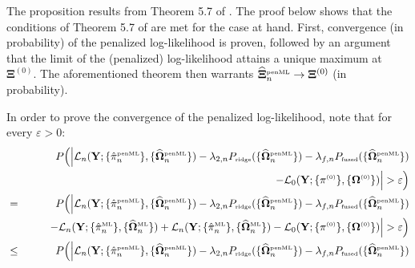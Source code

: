 \documentclass[10pt]{article}
\makeatletter
\newcommand{\proofname}{Proof.}
\newcounter{proof}\newcounter{currproofctr}\newcounter{endproofctr}%
\newenvironment{proof}[1][\proofname]{
  \th@nonumberplain
  \def\theorem@headerfont{\itshape}%
  \normalfont
  \@thm{proof}{proof}{#1}}%
  {\@endtheorem}
\makeatother
\begin{document}
\begin{proof}
The proposition results from Theorem 5.7 of \cite{VdVa2000}. The proof below shows that the conditions of Theorem 5.7 of  \cite{VdVa2000} are met for the case at hand. First, convergence (in probability) of the penalized log-likelihood is proven, followed by an argument that the limit of the (penalized) log-likelihood attains a unique maximum at $\mathbf{\Xi}^{(0)}$. The aforementioned theorem then warrants $\widehat{\mathbf{\Xi}}^{\mbox{{\tiny penML}}}_n \rightarrow \mathbf{\Xi}^{(0)}$ (in probability).

In order to prove the convergence of the penalized log-likelihood, note that for every $\varepsilon > 0$:
\begin{eqnarray}
& & \nonumber \hspace{-1.5cm} P \Big( \Big| \mathcal{L}_n(\mathbf{Y}; \{\hat{\pi}_n^{\mbox{{\tiny penML}}} \}, \{\widehat{\mathbf{\Omega}}_n^{\mbox{{\tiny penML}}} \} ) - \lambda_{2,n} P_{\mbox{{\tiny ridge}}}( \{\widehat{\mathbf{\Omega}}_n^{\mbox{{\tiny penML}}} \}) - \lambda_{f,n} P_{\mbox{{\tiny fused}}}( \{\widehat{\mathbf{\Omega}}_n^{\mbox{{\tiny penML}}} \})
\\
& & \nonumber  \qquad  - \mathcal{L}_0(\mathbf{Y}; \{\pi^{\mbox{{\tiny (0)}}} \}, \{\mathbf{\Omega}^{\mbox{{\tiny (0)}}} \} ) \Big| > \varepsilon \Big)
\\
& = & \nonumber  P \Big( \Big| \mathcal{L}_n(\mathbf{Y}; \{\hat{\pi}_n^{\mbox{{\tiny penML}}} \}, \{\widehat{\mathbf{\Omega}}_n^{\mbox{{\tiny penML}}} \} ) - \lambda_{2,n} P_{\mbox{{\tiny ridge}}}( \{\widehat{\mathbf{\Omega}}_n^{\mbox{{\tiny penML}}} \}) - \lambda_{f,n} P_{\mbox{{\tiny fused}}}( \{\widehat{\mathbf{\Omega}}_n^{\mbox{{\tiny penML}}} \})
\\
& & \nonumber  \qquad - \mathcal{L}_n(\mathbf{Y}; \{\hat{\pi}_n^{\mbox{{\tiny ML}}} \}, \{\widehat{\mathbf{\Omega}}_n^{\mbox{{\tiny ML}}} \} ) + \mathcal{L}_n(\mathbf{Y}; \{\hat{\pi}_n^{\mbox{{\tiny ML}}} \}, \{\widehat{\mathbf{\Omega}}_n^{\mbox{{\tiny ML}}} \} )  - \mathcal{L}_0(\mathbf{Y}; \{\pi^{\mbox{{\tiny (0)}}} \}, \{\mathbf{\Omega}^{\mbox{{\tiny (0)}}} \} ) \Big| > \varepsilon \Big)
\\
& \leq & \nonumber  P \Big( \Big| \mathcal{L}_n(\mathbf{Y}; \{\hat{\pi}_n^{\mbox{{\tiny penML}}} \}, \{\widehat{\mathbf{\Omega}}_n^{\mbox{{\tiny penML}}} \} ) - \lambda_{2,n} P_{\mbox{{\tiny ridge}}}( \{\widehat{\mathbf{\Omega}}_n^{\mbox{{\tiny penML}}} \}) - \lambda_{f,n} P_{\mbox{{\tiny fused}}}( \{\widehat{\mathbf{\Omega}}_n^{\mbox{{\tiny penML}}} \})

\end{eqnarray}
\end{proof}
\end{document}

